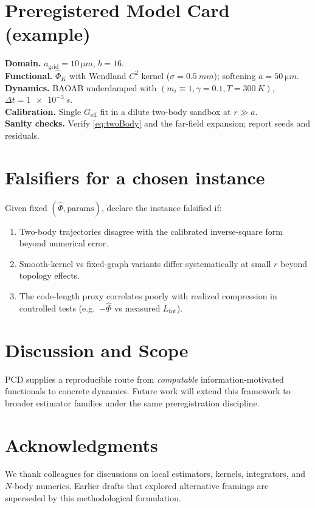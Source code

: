 \documentclass[11pt,a4paper]{article}
\numberwithin{equation}{section}
\begin{document}
\section{Preregistered Model Card (example)}
\textbf{Domain.} $a_{\text{grid}}=\SI{10}{\micro m}$, $b=16$. \\
\textbf{Functional.} $\widehat{\Phi}_K$ with Wendland $C^2$ kernel ($\sigma=\SI{0.5}{mm}$); softening $a=\SI{50}{\micro m}$. \\
\textbf{Dynamics.} BAOAB underdamped with $(m_i\equiv 1,\gamma=0.1,T=\SI{300}{K})$, $\Delta t=\SI{1e-3}{s}$. \\
\textbf{Calibration.} Single $G_{\text{eff}}$ fit in a dilute two-body sandbox at $r\gg a$. \\
\textbf{Sanity checks.} Verify \eqref{eq:twoBody} and the far-field expansion; report seeds and residuals.

\section{Falsifiers for a chosen instance}
Given fixed $(\widehat{\Phi},\text{params})$, declare the instance falsified if:
\begin{enumerate}[label=(F\arabic*)]
\item Two-body trajectories disagree with the calibrated inverse-square form beyond numerical error.
\item Smooth-kernel vs fixed-graph variants differ systematically at small $r$ beyond topology effects.
\item The code-length proxy correlates poorly with realized compression in controlled tests (e.g.\ $-\widehat{\Phi}$ vs measured $L_{\text{tot}}$).
\end{enumerate}

\section{Discussion and Scope}
PCD supplies a reproducible route from \emph{computable} information-motivated functionals to concrete dynamics. Future work will extend this framework to broader estimator families under the same preregistration discipline.

\section*{Acknowledgments}
We thank colleagues for discussions on local estimators, kernels, integrators, and $N$-body numerics. Earlier drafts that explored alternative framings are superseded by this methodological formulation.
\end{document}
